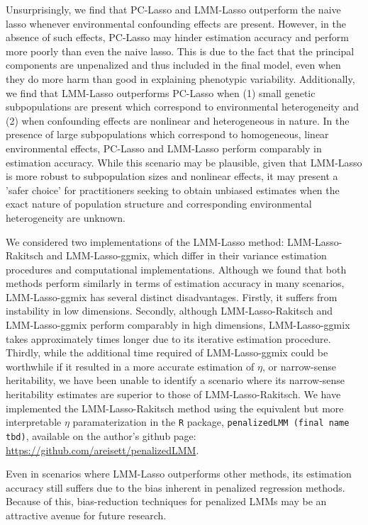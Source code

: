 Unsurprisingly, we find that PC-Lasso and LMM-Lasso outperform the naive lasso whenever environmental confounding effects are present. However, in the absence of such effects, PC-Lasso may hinder estimation accuracy and perform more poorly than even the naive lasso. This is due to the fact that the principal components are unpenalized and thus included in the final model, even when they do more harm than good in explaining phenotypic variability. Additionally, we find that LMM-Lasso outperforms PC-Lasso when (1) small genetic subpopulations are present which correspond to environmental heterogeneity and (2) when confounding effects are nonlinear and heterogeneous in nature. In the presence of large subpopulations which correspond to homogeneous, linear environmental effects, PC-Lasso and LMM-Lasso perform comparably in estimation accuracy. While this scenario may be plausible, given that LMM-Lasso is more robust to subpopulation sizes and nonlinear effects, it may present a 'safer choice' for practitioners seeking to obtain unbiased estimates when the exact nature of population structure and corresponding environmental heterogeneity are unknown.  

We considered two implementations of the LMM-Lasso method: LMM-Lasso-Rakitsch and LMM-Lasso-ggmix, which differ in their variance estimation procedures and computational implementations. Although we found that both methods perform similarly in terms of estimation accuracy in many scenarios, LMM-Lasso-ggmix has several distinct disadvantages. Firstly, it suffers from instability in low dimensions. Secondly, although LMM-Lasso-Rakitsch and LMM-Lasso-ggmix perform comparably in high dimensions, LMM-Lasso-ggmix takes approximately  times longer due to its iterative estimation procedure. Thirdly, while the additional time required of LMM-Lasso-ggmix could be worthwhile if it resulted in a more accurate estimation of $\eta$, or narrow-sense heritability, we have been unable to identify a scenario where its narrow-sense heritability estimates are superior to those of LMM-Lasso-Rakitsch. We have implemented the LMM-Lasso-Rakitsch method using the equivalent but more interpretable $\eta$ paramaterization in the \texttt{R} package, \texttt{penalizedLMM (final name tbd)}, available on the author's github page: \url{https://github.com/areisett/penalizedLMM}.


Even in scenarios where LMM-Lasso outperforms other methods, its estimation accuracy still suffers due to the bias inherent in penalized regression methods. Because of this, bias-reduction techniques for penalized LMMs may be an attractive avenue for future research.

